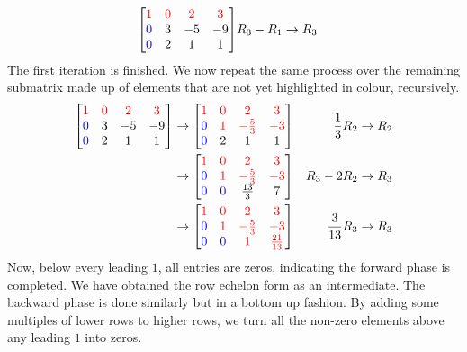 \begin{solution}
\begin{align*}
\begin{bmatrix}
\textcolor{red}{1} & \textcolor{red}{0} & \textcolor{red}{2} & \textcolor{red}{3} \\
\textcolor{blue}{0} & 3 & -5 & -9 \\
\textcolor{blue}{0} & 2 & 1 & 1
\end{bmatrix}
& R_3-R_1 \to R_3
\end{align*}
The first iteration is finished. We now repeat the same process over the remaining submatrix made up of elements that are not yet highlighted in colour, recursively.
\begin{align*}
\begin{bmatrix}
\textcolor{red}{1} & \textcolor{red}{0} & \textcolor{red}{2} & \textcolor{red}{3} \\
\textcolor{blue}{0} & 3 & -5 & -9 \\
\textcolor{blue}{0} & 2 & 1 & 1
\end{bmatrix}
&\to
\begin{bmatrix}
\textcolor{red}{1} & \textcolor{red}{0} & \textcolor{red}{2} & \textcolor{red}{3} \\
\textcolor{blue}{0} & \textcolor{red}{1} & \textcolor{red}{-\frac{5}{3}} & \textcolor{red}{-3} \\
\textcolor{blue}{0} & 2 & 1 & 1
\end{bmatrix}
& \frac{1}{3}R_2 \to R_2 \\
&\to
\begin{bmatrix}
\textcolor{red}{1} & \textcolor{red}{0} & \textcolor{red}{2} & \textcolor{red}{3} \\
\textcolor{blue}{0} & \textcolor{red}{1} & \textcolor{red}{-\frac{5}{3}} & \textcolor{red}{-3} \\
\textcolor{blue}{0} & \textcolor{blue}{0} & \frac{13}{3} & 7
\end{bmatrix}
& R_3-2R_2 \to R_3 \\
&\to
\begin{bmatrix}
\textcolor{red}{1} & \textcolor{red}{0} & \textcolor{red}{2} & \textcolor{red}{3} \\
\textcolor{blue}{0} & \textcolor{red}{1} & \textcolor{red}{-\frac{5}{3}} & \textcolor{red}{-3} \\
\textcolor{blue}{0} & \textcolor{blue}{0} & \textcolor{red}{1} & \textcolor{red}{\frac{21}{13}}
\end{bmatrix}
& \frac{3}{13}R_3 \to R_3 
\end{align*}
Now, below every leading $1$, all entries are zeros, indicating the forward phase is completed. We have obtained the row echelon form as an intermediate. The backward phase is done similarly but in a bottom up fashion. By adding some multiples of lower rows to higher rows, we turn all the non-zero elements above any leading $1$ into zeros.

\end{solution}
